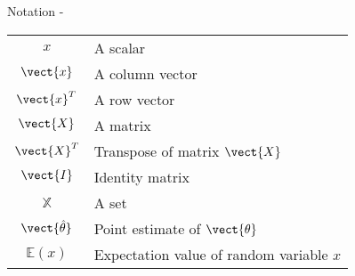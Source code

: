 
\begin{frame}[allowframebreaks,t]{Notation -}

\begin{tabular}{cl}

$x$                   & A scalar \\
$\vect{x}$            & A column vector \\
$\vect{x}^T$          & A row vector \\
$\vect{X}$            & A matrix \\
$\vect{X}^T$          & Transpose of matrix  $\vect{X}$ \\
$\vect{I}$            & Identity matrix \\
$\mathbb{X}$          & A set \\
$\vect{\hat{\theta}}$ & Point estimate of $\vect{\theta}$ \\
$\mathbb{E}(x)$       & Expectation value of random variable $x$ \\

\end{tabular}

\end{frame}
